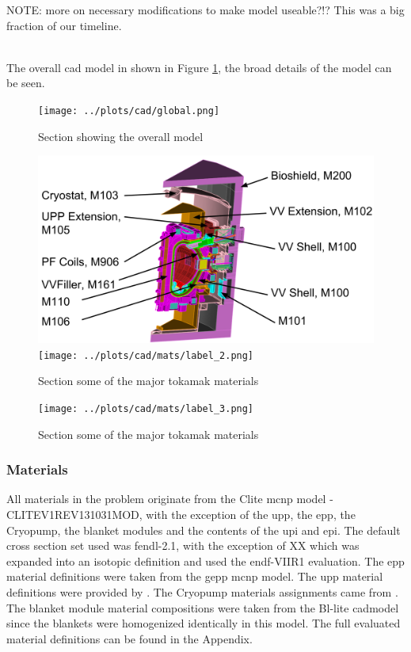 \documentclass[12pt]{article}
\begin{document}
NOTE: more on necessary modifications to make model useable?!?  This was a big
fraction of our timeline.

\\
The overall \gls{cad} model in shown in Figure \ref{fig:cad_iter_global}, the
broad details of the model can be seen. 
\begin{figure}[ht!]
  \centering
  \texttt{[image: ../plots/cad/global.png]}
  \caption{Section showing the overall model}
  \label{fig:cad_iter_global}
\end{figure}

\begin{figure}[p]
  \centering
  \includegraphics[scale=0.32]{../plots/cad/mats/label_1.png}
  \texttt{[image: ../plots/cad/mats/label\_2.png]}
  \caption{Section some of the major tokamak materials}
  \label{fig:material_assign_1}
\end{figure}

\begin{figure}[p]
  \centering
  \texttt{[image: ../plots/cad/mats/label\_3.png]}
  \caption{Section some of the major tokamak materials}
  \label{fig:material_assign_2}
\end{figure}

\newpage
\clearpage
\subsubsection{Materials}
All materials in the problem originate from the Clite \gls{mcnp} model -
CLITE\textunderscore V1\textunderscore REV131031\textunderscore MOD, with the
exception of the \gls{upp}, the \gls{epp}, the
Cryopump, the blanket modules and the contents of the \gls{upi} and \gls{epi}.
The default cross section set used was \gls{fendl}-2.1, with the exception of XX
which was expanded into an isotopic definition and used the \gls{endf}-VIIR1
evaluation. The \gls{epp} material definitions were taken from the \gls{gepp}
\gls{mcnp} model\cite{epp_materials}. The \gls{upp} material definitions were
provided by \cite{bertalot_communication}. The Cryopump materials assignments
came from \cite{cryopump_communication}. The blanket module material
compositions were taken from the Bl-lite \gls{cad}model since the blankets were
homogenized identically in this model. The full evaluated material definitions
can be found in the Appendix.
\newpage
\end{document}
